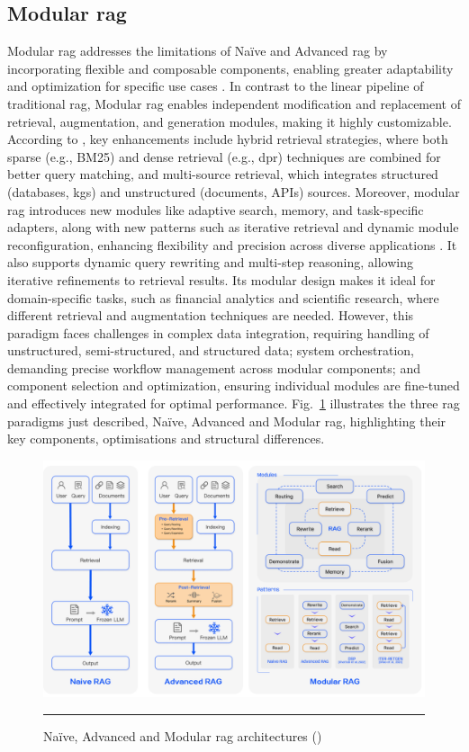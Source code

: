 \subsection*{Modular \gls{rag}}\label{sec:modular-rag}
Modular \gls{rag} addresses the limitations of Na\"ive and Advanced \gls{rag} by incorporating flexible and composable components, enabling greater adaptability and optimization for specific use cases \cite{gao_retrieval-augmented_2024}.
In contrast to the linear pipeline of traditional \gls{rag}, Modular \gls{rag} enables independent modification and replacement of retrieval, augmentation, and generation modules, making it highly customizable.
According to \cite{singh2025}, key enhancements include hybrid retrieval strategies, where both sparse (e.g., BM25) and dense retrieval \cite{Karpukhin2020} (e.g., \gls{dpr}) techniques are combined for better query matching, and multi-source retrieval, which integrates structured (databases, \glspl{kg}) and unstructured (documents, APIs) sources.
Moreover, modular \gls{rag} introduces new modules like adaptive search, memory, and task-specific adapters, along with new patterns such as iterative retrieval and dynamic module reconfiguration, enhancing flexibility and precision across diverse applications \cite{gao_retrieval-augmented_2024}.
It also supports dynamic query rewriting and multi-step reasoning, allowing iterative refinements to retrieval results.
Its modular design makes it ideal for domain-specific tasks, such as financial analytics and scientific research, where different retrieval and augmentation techniques are needed.
However, this paradigm faces challenges in complex data integration, requiring handling of unstructured, semi-structured, and structured data; system orchestration, demanding precise workflow management across modular components; and component selection and optimization, ensuring individual modules are fine-tuned and effectively integrated for optimal performance.
Fig.~\ref{fig:naive-advanced-modular-rag} illustrates the three \gls{rag} paradigms just described, Na\"ive, Advanced and Modular \gls{rag}, highlighting their key components, optimisations and structural differences.
\begin{figure}[htbp]
    \centering
 \includegraphics[width=.75\textwidth]{figures/literature-review/naive-advanced-modular-rag.png}
     \rule{35em}{0.5pt}
    \caption{Na\"ive, Advanced and Modular \gls{rag} architectures (\textcite{gao_retrieval-augmented_2024})}
 \label{fig:naive-advanced-modular-rag}
\end{figure}

